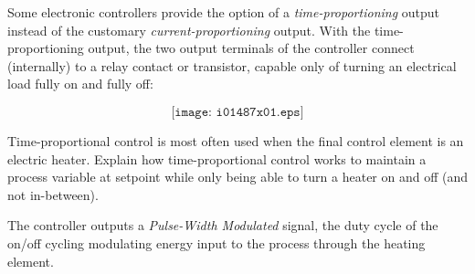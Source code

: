 

Some electronic controllers provide the option of a {\it time-proportioning} output instead of the customary {\it current-proportioning} output.  With the time-proportioning output, the two output terminals of the controller connect (internally) to a relay contact or transistor, capable only of turning an electrical load fully on and fully off:

$$\texttt{[image: i01487x01.eps]}$$

Time-proportional control is most often used when the final control element is an electric heater.  Explain how time-proportional control works to maintain a process variable at setpoint while only being able to turn a heater on and off (and not in-between).







The controller outputs a {\it Pulse-Width Modulated} signal, the duty cycle of the on/off cycling modulating energy input to the process through the heating element.











